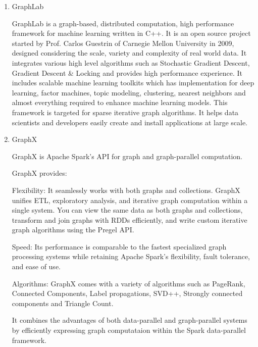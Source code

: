 \begin{enumerate}
\item {} 
GraphLab

GraphLab \label{\detokenize{i524/technologies:id111}}{\hyperref[\detokenize{i524/technologies:www-graphlab}]{\sphinxcrossref{{[}98{]}}}} is a graph-based, distributed
computation, high performance framework for machine learning
written in C++. It is an open source project started by
Prof. Carlos Guestrin of Carnegie Mellon University in 2009,
designed considering the scale, variety and complexity of real
world data. It integrates various high level algorithms such as
Stochastic Gradient Descent, Gradient Descent \& Locking and
provides high performance experience. It includes scalable machine
learning toolkits which has implementation for deep learning,
factor machines, topic modeling, clustering, nearest neighbors and
almost everything required to enhance machine learning
models. This framework is targeted for sparse iterative graph
algorithms. It helps data scientists and developers easily create
and install applications at large scale.

\item {} 
GraphX

GraphX is Apache Spark's API for graph and graph-parallel
computation.  \label{\detokenize{i524/technologies:id112}}{\hyperref[\detokenize{i524/technologies:www-graphx}]{\sphinxcrossref{{[}99{]}}}}

GraphX provides:

Flexibility: It seamlessly works with both graphs and
collections. GraphX unifies ETL, exploratory analysis, and
iterative graph computation within a single system. You can view
the same data as both graphs and collections, transform and join
graphs with RDDs efficiently, and write custom iterative graph
algorithms using the Pregel API.

Speed: Its performance is comparable to the fastest specialized
graph processing systems while retaining Apache Spark's
flexibility, fault tolerance, and ease of use.

Algorithms: GraphX comes with a variety of algorithms such as
PageRank, Connected Components, Label propagations, SVD++,
Strongly connected components and Triangle Count.

It combines the advantages of both data-parallel and
graph-parallel systems by efficiently expressing graph
computataion within the Spark data-parallel
framework. \label{\detokenize{i524/technologies:id113}}{\hyperref[\detokenize{i524/technologies:www-graphx1}]{\sphinxcrossref{{[}100{]}}}}


\end{enumerate}
